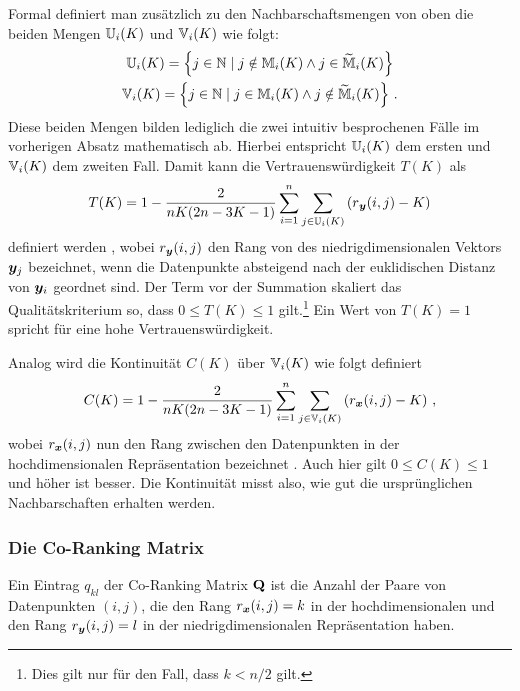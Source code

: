 Formal definiert man zusätzlich zu den Nachbarschaftsmengen von oben die beiden Mengen
$\mathbb{U}_i(K)$ und $\mathbb{V}_i(K)$ wie folgt:
\begin{gather}
	\mathbb{U}_i(K) =  \left\{ j \in \mathbb{N} \mid j \notin \mathbb{M}_i(K) \land j \in \widetilde{\mathbb{M}}_i(K) \right\} \\
	\mathbb{V}_i(K) =  \left\{ j \in \mathbb{N} \mid j \in \mathbb{M}_i(K) \land j \notin \widetilde{\mathbb{M}}_i(K) \right\} \, .
\end{gather}
Diese beiden Mengen bilden lediglich die zwei intuitiv besprochenen Fälle im vorherigen Absatz mathematisch ab. Hierbei entspricht $\mathbb{U}_i(K)$ dem ersten und $\mathbb{V}_i(K)$ dem zweiten Fall.
Damit kann die Vertrauenswürdigkeit $T(K)$ als
\begin{equation}
	T(K) = 1 - \frac{2}{nK(2n - 3K - 1)} \sum_{i = 1}^{n}\sum_{j \in \set{U}_i(K) } \left( r­_{\vect{y}}(i, j) - K \right)
\end{equation}
definiert werden \parencite[487]{Venna.2001}, wobei $r_{\bm{y}}(i, j)$ den Rang von des niedrigdimensionalen Vektors
$\bm{y}_j$ bezeichnet, wenn die Datenpunkte absteigend nach der euklidischen Distanz von
$\bm{y}_i$ geordnet sind. Der Term vor der Summation skaliert das Qualitätskriterium so, dass $0
	\leq T(K) \leq 1$ gilt.\footnote{Dies gilt nur für den Fall, dass $k < n/2$ gilt.} Ein Wert von
$T(K) = 1­$ spricht für eine hohe Vertrauenswürdigkeit.

Analog wird die Kontinuität $C(K)$ über $\mathbb{V}_i(K)$ wie folgt definiert
\begin{equation}
	C(K) = 1 - \frac{2}{nK(2n - 3K - 1)} \sum_{i = 1}^{n}\sum_{j \in \mathbb{V}_i(K) } \left( r_{\bm{x}}(i, j) - K \right) \, ,
\end{equation}
wobei $r_{\bm{x}}(i, j)$ nun den Rang zwischen den Datenpunkten in der hochdimensionalen Repräsentation bezeichnet \parencite[487]{Venna.2001}. Auch hier gilt $0 \leq C(K) \leq 1$ und höher ist besser. Die Kontinuität
misst also, wie gut die ursprünglichen Nachbarschaften erhalten werden. 

\subsubsection{Die Co-Ranking Matrix}
Ein Eintrag $q_{kl}$ der Co-Ranking Matrix $\mathbf{Q}$ ist die Anzahl der Paare von Datenpunkten $(i,
	j)$, die den Rang $r_{\bm{x}}(i, j) = k$ in der hochdimensionalen und den Rang $r_{\bm{y}}(i,
	j) = l$ in der niedrigdimensionalen Repräsentation haben.

